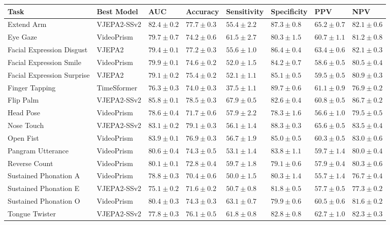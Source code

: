 \begin{table}
\label{tab:race_dist}
\begin{tabular}{llllllll}
\toprule
Task & Best Model & AUC & Accuracy & Sensitivity & Specificity & PPV & NPV \\
\midrule
Extend Arm & VJEPA2-SSv2 & $82.4 \pm 0.2$ & $77.7 \pm 0.3$ & $55.4 \pm 2.2$ & $87.3 \pm 0.8$ & $65.2 \pm 0.7$ & $82.1 \pm 0.6$ \\
Eye Gaze & VideoPrism & $79.7 \pm 0.7$ & $74.2 \pm 0.6$ & $61.5 \pm 2.7$ & $80.3 \pm 1.5$ & $60.7 \pm 1.1$ & $81.2 \pm 0.8$ \\
Facial Expression Disgust & VJEPA2 & $79.4 \pm 0.1$ & $77.2 \pm 0.3$ & $55.6 \pm 1.0$ & $86.4 \pm 0.4$ & $63.4 \pm 0.6$ & $82.1 \pm 0.3$ \\
Facial Expression Smile & VideoPrism & $79.9 \pm 0.1$ & $74.6 \pm 0.2$ & $52.0 \pm 1.5$ & $84.2 \pm 0.7$ & $58.6 \pm 0.5$ & $80.5 \pm 0.4$ \\
Facial Expression Surprise & VJEPA2 & $79.1 \pm 0.2$ & $75.4 \pm 0.2$ & $52.1 \pm 1.1$ & $85.1 \pm 0.5$ & $59.5 \pm 0.5$ & $80.9 \pm 0.3$ \\
Finger Tapping & TimeSformer & $76.3 \pm 0.3$ & $74.0 \pm 0.3$ & $37.5 \pm 1.1$ & $89.7 \pm 0.6$ & $61.1 \pm 0.9$ & $76.9 \pm 0.2$ \\
Flip Palm & VJEPA2-SSv2 & $85.8 \pm 0.1$ & $78.5 \pm 0.3$ & $67.9 \pm 0.5$ & $82.6 \pm 0.4$ & $60.8 \pm 0.5$ & $86.7 \pm 0.2$ \\
Head Pose & VideoPrism & $78.6 \pm 0.4$ & $71.7 \pm 0.6$ & $57.9 \pm 2.2$ & $78.3 \pm 1.6$ & $56.6 \pm 1.0$ & $79.5 \pm 0.5$ \\
Nose Touch & VJEPA2-SSv2 & $83.1 \pm 0.2$ & $79.1 \pm 0.3$ & $56.1 \pm 1.4$ & $88.3 \pm 0.3$ & $65.6 \pm 0.5$ & $83.5 \pm 0.4$ \\
Open Fist & VideoPrism & $83.9 \pm 0.1$ & $76.9 \pm 0.3$ & $56.7 \pm 1.9$ & $85.0 \pm 0.5$ & $60.3 \pm 0.5$ & $83.0 \pm 0.6$ \\
Pangram Utterance & VideoPrism & $80.6 \pm 0.4$ & $74.3 \pm 0.5$ & $53.1 \pm 1.4$ & $83.8 \pm 1.1$ & $59.7 \pm 1.4$ & $80.0 \pm 0.4$ \\
Reverse Count & VideoPrism & $80.1 \pm 0.1$ & $72.8 \pm 0.4$ & $59.7 \pm 1.8$ & $79.1 \pm 0.6$ & $57.9 \pm 0.4$ & $80.3 \pm 0.6$ \\
Sustained Phonation A & VideoPrism & $78.8 \pm 0.3$ & $70.4 \pm 0.6$ & $50.0 \pm 1.5$ & $80.3 \pm 1.4$ & $55.7 \pm 1.4$ & $76.7 \pm 0.4$ \\
Sustained Phonation E & VJEPA2-SSv2 & $75.1 \pm 0.2$ & $71.6 \pm 0.2$ & $50.7 \pm 0.8$ & $81.8 \pm 0.5$ & $57.7 \pm 0.5$ & $77.3 \pm 0.2$ \\
Sustained Phonation O & VideoPrism & $80.4 \pm 0.3$ & $74.3 \pm 0.3$ & $63.1 \pm 0.7$ & $79.9 \pm 0.6$ & $60.5 \pm 0.6$ & $81.6 \pm 0.2$ \\
Tongue Twister & VJEPA2-SSv2 & $77.8 \pm 0.3$ & $76.1 \pm 0.5$ & $61.8 \pm 0.8$ & $82.8 \pm 0.8$ & $62.7 \pm 1.0$ & $82.3 \pm 0.3$ \\
\bottomrule
\end{tabular}
\end{table}
